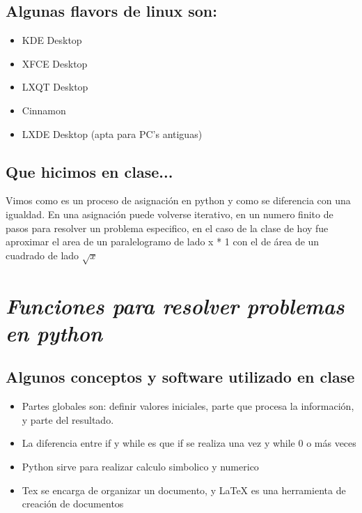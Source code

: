 \documentclass{book}
\begin{document}
	\subsection {Algunas flavors de linux son:}
	\begin{itemize}
		\item KDE Desktop
		\item XFCE Desktop
		\item LXQT Desktop
		\item Cinnamon
		\item LXDE Desktop (apta para PC's antiguas)
	\end{itemize}
	\subsection{ Que hicimos en clase...} 
	
	Vimos como es un proceso de asignación en python y como se diferencia con una igualdad. En una asignación puede volverse iterativo, en un numero finito de pasos para resolver un problema especifico, en el caso de la clase de hoy fue aproximar el area de un paralelogramo de lado x * 1 con el de área de un cuadrado de lado $\sqrt{x}$
	
		
	




\section{\textit{Funciones para resolver problemas en python}}%
\begin{flushright}
	\date{15 de enero de 2019}
\end{flushright}

	\subsection {Algunos conceptos y software utilizado en clase}%
	\begin{itemize}
		\item Partes globales son: definir valores iniciales, parte que procesa la información, y parte del resultado.	
		\item La diferencia entre if y while es que if se realiza una vez y while 0 o más veces		
		\item Python sirve para realizar calculo simbolico y numerico
		\item Tex se encarga de organizar un documento, y LaTeX es una herramienta de creación de documentos
	\end{itemize}
	
\end{document}
